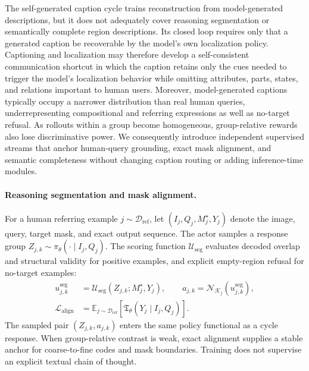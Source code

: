\documentclass{article}
\begin{document}
The self-generated caption cycle trains reconstruction from model-generated descriptions, but it does not adequately cover reasoning segmentation or semantically complete region descriptions. Its closed loop requires only that a generated caption be recoverable by the model's own localization policy. Captioning and localization may therefore develop a self-consistent communication shortcut in which the caption retains only the cues needed to trigger the model's localization behavior while omitting attributes, parts, states, and relations important to human users. Moreover, model-generated captions typically occupy a narrower distribution than real human queries, underrepresenting compositional and referring expressions as well as no-target refusal. As rollouts within a group become homogeneous, group-relative rewards also lose discriminative power. We consequently introduce independent supervised streams that anchor human-query grounding, exact mask alignment, and semantic completeness without changing caption routing or adding inference-time modules.

\paragraph{Reasoning segmentation and mask alignment.}
For a human referring example $j\sim\mathcal D_{\mathrm{ref}}$, let $(I_j,Q_j,M_j^\star,Y_j)$ denote the image, query, target mask, and exact output sequence. The actor samples a response group $Z_{j,k}\sim\pi_\theta(\cdot\mid I_j,Q_j)$. The scoring function $\mathcal U_{\mathrm{seg}}$ evaluates decoded overlap and structural validity for positive examples, and explicit empty-region refusal for no-target examples:
\begin{equation}\label{eq:supervised-segmentation}\begin{aligned}
 u_{j,k}^{\mathrm{seg}}&=\mathcal U_{\mathrm{seg}}(Z_{j,k};M_j^\star,Y_j),\qquad
 a_{j,k}=\mathcal N_{\mathcal K_j}(u_{j,k}^{\mathrm{seg}}),\\
 \mathcal L_{\mathrm{align}}&=\mathbb E_{j\sim\mathcal D_{\mathrm{ref}}}\!\left[
 \mathfrak T_\theta(Y_j\mid I_j,Q_j)
 \right].
\end{aligned}\end{equation}
The sampled pair $(Z_{j,k},a_{j,k})$ enters the same policy functional as a cycle response. When group-relative contrast is weak, exact alignment supplies a stable anchor for coarse-to-fine codes and mask boundaries. Training does not supervise an explicit textual chain of thought.
\end{document}

